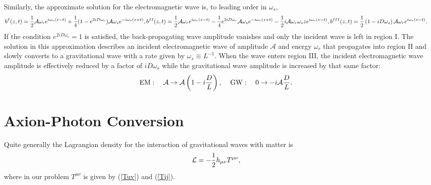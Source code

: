 \documentclass[12pt]{article}
\let\m=\mu    \let\n=\nu    \let\x=\xi     \let\p=\pi    \let\r=\rho
\def\\{\hfill\break} \let\==\equiv
\def\be{\begin{equation}}
\def\ee{\end{equation}}
\begin{document}
Similarly, the approximate solution for the electromagnetic wave is, to leading order in $\omega_s$,
\begin{equation}\label{bapprox}
    \begin{split}
        b^I(z,t) = \frac{1}{2} \mathcal{A} \omega_r e^{i \omega_r(z-t)} + \frac{1}{4} (1-e^{2iD\omega_r}) \mathcal{A} \omega_s e^{-i\omega_r(z+t)},\\
        b^{II}(z,t) = \frac{1}{2} \mathcal{A} \omega_r e^{i\omega_r(z-t)}  - \frac{1}{4} e^{2iD\omega_r} \mathcal{A} \omega_s e^{-i\omega_r(z+t)} - \frac{1}{2} i \mathcal{A} \omega_r \omega_s z e^{i\omega_r (z-t)}, \\
        b^{III}(z,t) = \frac{1}{2} \left(1 - i D \omega_s \right) \mathcal{A} \omega_r e^{i\omega_r(z-t)}.
    \end{split}
\end{equation}
If the condition $e^{2iD\omega_r} = 1$ is satisfied, the back-propagating wave amplitude vanishes and only the incident wave is left in region I. The solution in this approximation describes an incident electromagnetic wave of amplitude $\mathcal{A}$ and energy $\omega_r$ that propagates into region II and slowly converts to a gravitational wave with a rate given by $\omega_s \equiv L^{-1}$. When the wave enters region III, the incident electromagnetic wave amplitude is effectively reduced by a factor of $i D \omega_s$ while the gravitational wave amplitude is increased by that same factor:
\begin{align}
 \begin{split} 
        &\text{EM}: \quad \mathcal{A} \rightarrow \mathcal{A} \left(1 - i \frac{D}{L}\right), \\ \
        &\text{GW}: \quad  0 \rightarrow - i \mathcal{A} \frac{D}{L}.
\end{split}
\end{align}

\section{Axion-Photon Conversion}
\setcounter{equation}{0}\label{sec4}
Quite generally the Lagrangian density for the interaction of gravitational waves with matter is
\be
{\cal L} = -\frac12 h_{\m\n}T^{\m\n} ,
\ee
where in our problem $T^{\m\n}$ is given by (\ref{Tuv}) and (\ref{Tij}).
\end{document}
